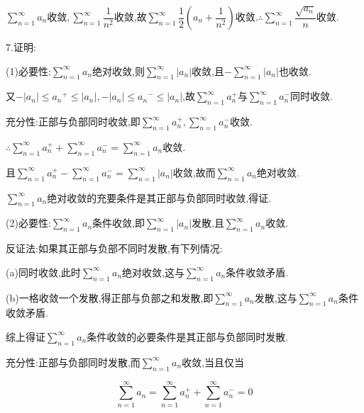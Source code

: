 $\sum\limits_{n = 1}^\infty  {{a_n}} $收敛$,\sum\limits_{n = 1}^\infty  {\dfrac{1}{{{n^2}}}} $收敛,故$\sum\limits_{n = 1}^\infty  {\dfrac{1}{2}({a_n} + \dfrac{1}{{{n^2}}})} $收敛.$\therefore \sum\limits_{n = 1}^\infty  {\dfrac{{\sqrt {{a_n}} }}{n}} $收敛.

7.证明:

(1)必要性:$\sum\limits_{n = 1}^\infty  {{a_n}} $绝对收敛,则$\sum\limits_{n = 1}^\infty  {\left| {{a_n}} \right|} $收敛,且$ - \sum\limits_{n = 1}^\infty  {\left| {{a_n}} \right|} $也收敛.

又$ - \left| {{a_n}} \right| \leqslant {a_n}^ +  \leqslant \left| {{a_n}} \right|, - \left| {{a_n}} \right| \leqslant {a_n}^ -  \leqslant \left| {{a_n}} \right|$,故$\sum\limits_{n = 1}^\infty  {a_n^ + } $与$\sum\limits_{n = 1}^\infty  {a_n^ - } $同时收敛.

充分性:正部与负部同时收敛,即$\sum\limits_{n = 1}^\infty  {a_n^ + } ,\sum\limits_{n = 1}^\infty  {a_n^ - } $收敛.

$\therefore \sum\limits_{n = 1}^\infty  {a_n^ + }  + \sum\limits_{n = 1}^\infty  {a_n^ - }  = \sum\limits_{n = 1}^\infty  {{a_n}} $收敛.

且$\sum\limits_{n = 1}^\infty  {a_n^ + }  - \sum\limits_{n = 1}^\infty  {a_n^ - }  = \sum\limits_{n = 1}^\infty  {\left| {{a_n}} \right|} $收敛,故而$\sum\limits_{n = 1}^\infty  {{a_n}} $绝对收敛.

$\sum\limits_{n = 1}^\infty  {{a_n}} $绝对收敛的充要条件是其正部与负部同时收敛,得证.

(2)必要性:$\sum\limits_{n = 1}^\infty  {{a_n}} $条件收敛,即$\sum\limits_{n = 1}^\infty  {\left| {{a_n}} \right|} $发散,且$\sum\limits_{n = 1}^\infty  {{a_n}} $收敛.

反证法:如果其正部与负部不同时发散,有下列情况:

(a)同时收敛,此时$\sum\limits_{n = 1}^\infty  {{a_n}} $绝对收敛,这与$\sum\limits_{n = 1}^\infty  {{a_n}} $条件收敛矛盾.

(b)一格收敛一个发散,得正部与负部之和发散,即$\sum\limits_{n = 1}^\infty  {{a_n}} $发散,这与$\sum\limits_{n = 1}^\infty  {{a_n}} $条件收敛矛盾.

综上得证$\sum\limits_{n = 1}^\infty  {{a_n}} $条件收敛的必要条件是其正部与负部同时发散.

充分性:正部与负部同时发散,而$\sum\limits_{n = 1}^\infty  {{a_n}} $收敛,当且仅当

\[\sum\limits_{n = 1}^\infty  {{a_n}}  = \sum\limits_{n = 1}^\infty  {a_n^ + }  + \sum\limits_{n = 1}^\infty  {a_n^ - }  = 0\]


